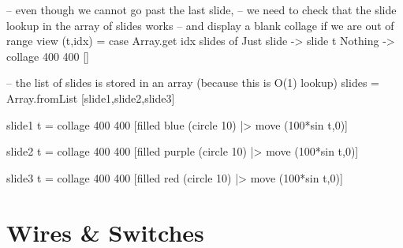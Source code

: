 \documentclass[12pt]{amsbook}
\begin{document}
-- even though we cannot go past the last slide,
-- we need to check that the slide lookup in the array of slides works
-- and display a blank collage if we are out of range
view (t,idx) = case Array.get idx slides of
                Just slide -> slide t
                Nothing    -> collage 400 400 []

-- the list of slides is stored in an array (because this is O(1) lookup)
slides = Array.fromList [slide1,slide2,slide3]

slide1 t = collage 400 400 [filled blue (circle 10) |> move (100*sin t,0)]

slide2 t = collage 400 400 [filled purple (circle 10) |> move (100*sin t,0)]

slide3 t = collage 400 400 [filled red (circle 10) |> move (100*sin t,0)]

\chapter{Wires \& Switches}
%
\end{document}
